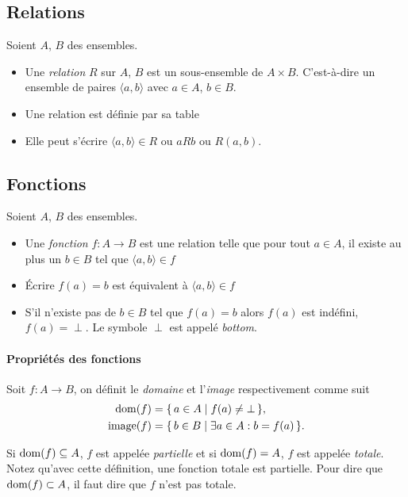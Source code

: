 
\subsection{Relations}
\label{subsec:relations}
Soient $A$, $B$ des ensembles.
\begin{itemize}
	\item Une \emph{relation} $R$ sur $A$, $B$ est un sous-ensemble de $A \times B$. C'est-à-dire
		un ensemble de paires $\langle a,b \rangle$ avec $a\in A$, $b\in B$.
	\item Une relation est définie par sa table
	\item Elle peut s'écrire $\langle a,b \rangle \in R$ ou $aRb$ ou $R(a,b)$.
\end{itemize}


\subsection{Fonctions}
\label{subsec:fonctions}
Soient $A$, $B$ des ensembles.
\begin{itemize}
  	\item Une \emph{fonction} $f \colon A \rightarrow B$ est une relation telle que pour tout $a \in
	A$, il existe au plus un $b \in B$ tel que $\langle a,b \rangle \in f$
	\item Écrire $f(a)=b$ est équivalent à $\langle a,b \rangle \in f$
	\item S'il n'existe pas de $b \in B$ tel que $f(a)=b$ alors $f(a)$ est indéfini,
		$f(a) = \perp$.  Le symbole $\perp$ est appelé \emph{bottom}.
\end{itemize}

\paragraph{Propriétés des fonctions}
\label{par:proprietes_des_fonctions}
Soit $f\colon A \to B$, on définit le \emph{domaine} et l'\emph{image} respectivement comme suit
\begin{align*}
  \operatorname{dom}(f)   & = \{\, a \in A \mid f(a) \neq \bot \,\},\\
  \operatorname{image}(f) & = \{\, b \in B \mid \exists a \in A : b = f(a) \,\}.
\end{align*}

Si $\operatorname{dom}(f) \subseteq A$, $f$ est appelée \emph{partielle} et si $\operatorname{dom}(f) = A$, $f$ est appelée \emph{totale}.
Notez qu'avec cette définition, une fonction totale est partielle.
Pour dire que $\operatorname{dom}(f) \subset A$, il faut dire que $f$ n'est pas totale.

